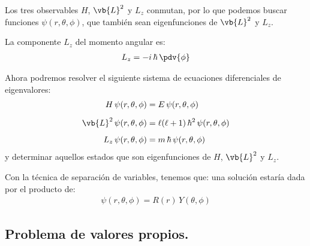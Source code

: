 Los tres observables $H$, $\vb{L}^{2}$ y $L_{z}$ conmutan, por lo que podemos buscar funciones $\psi (r, \theta, \phi)$, que también sean eigenfunciones de $\vb{L}^{2}$ y $L_{z}$.
\par
La componente $L_{z}$ del momento angular es:
\begin{align*}
L_{z} = - i \, \hbar \, \pdv{\phi}
\end{align*}

Ahora podremos resolver el siguiente sistema de ecuaciones diferenciales de eigenvalores:
\begin{align}
H \, \psi (r, \theta, \phi) &= E \, \psi (r, \theta, \phi) \label{eq:ecuacion_08_05} \\[0.5em]
\vb{L}^{2} \, \psi (r, \theta, \phi) &= \ell (\ell + 1) \, \hbar^{2} \, \psi (r, \theta, \phi) \label{eq:ecuacion_08_06} \\[0.5em]
L_{z} \, \psi (r, \theta, \phi) &= m \, \hbar \, \psi (r, \theta, \phi) \label{eq:ecuacion_08_07}
\end{align}
y determinar aquellos estados que son eigenfunciones de $H$, $\vb{L}^{2}$ y $L_{z}$.
\par
Con la técnica de separación de variables, tenemos que: una solución estaría dada por el producto de:
\begin{align}
\psi (r, \theta, \phi) = R (r) \, Y (\theta, \phi)
\label{eq:ecuacion_08_08}
\end{align}




\subsection{Problema de valores propios.}

